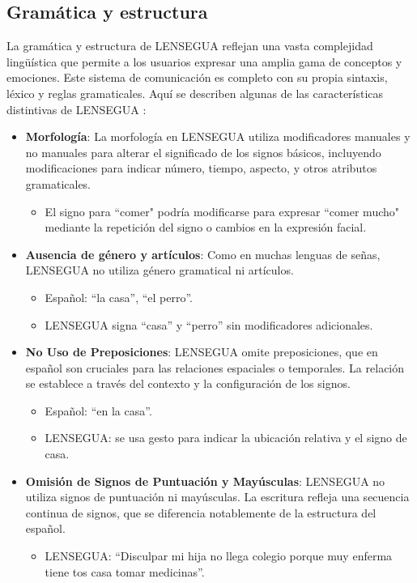 \subsection{Gramática y estructura}
La gramática y estructura de LENSEGUA reflejan una vasta complejidad lingüística que permite a los usuarios expresar una amplia gama de conceptos y emociones. Este sistema de comunicación es completo con su propia sintaxis, léxico y reglas gramaticales. Aquí se describen algunas de las características distintivas de LENSEGUA \cite{EnSenasCultura} \cite{EnSenasGramatica} \cite{EnSenasTecnicas}:

\begin{itemize}

    \item \textbf{Morfología}: La morfología en LENSEGUA utiliza modificadores manuales y no manuales para alterar el significado de los signos básicos, incluyendo modificaciones para indicar número, tiempo, aspecto, y otros atributos gramaticales.
    \begin{itemize}
        \item El signo para ``comer" podría modificarse para expresar ``comer mucho" mediante la repetición del signo o cambios en la expresión facial.
    \end{itemize}
    
    \item \textbf{Ausencia de género y artículos}: Como en muchas lenguas de señas, LENSEGUA no utiliza género gramatical ni artículos.
    \begin{itemize}
        \item Español: ``la casa'', ``el perro''.
        \item LENSEGUA signa ``casa'' y ``perro'' sin modificadores adicionales.
    \end{itemize}
    
    \item \textbf{No Uso de Preposiciones}: LENSEGUA omite preposiciones, que en español son cruciales para las relaciones espaciales o temporales. La relación se establece a través del contexto y la configuración de los signos.
    \begin{itemize}
        \item Español: ``en la casa''.
        \item LENSEGUA: se usa gesto para indicar la ubicación relativa y el signo de casa.
    \end{itemize}
    
    \item \textbf{Omisión de Signos de Puntuación y Mayúsculas}: LENSEGUA no utiliza signos de puntuación ni mayúsculas. La escritura refleja una secuencia continua de signos, que se diferencia notablemente de la estructura del español.
    \begin{itemize}
        \item LENSEGUA: ``Disculpar mi hija no llega colegio porque muy enferma tiene tos casa tomar medicinas''.
    \end{itemize}
    

\end{itemize}
